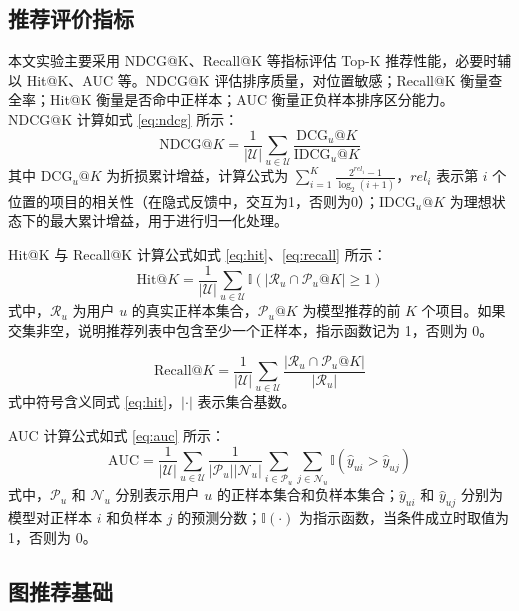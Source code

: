 \subsection{推荐评价指标}
本文实验主要采用 NDCG@K、Recall@K 等指标评估 Top-K 推荐性能，必要时辅以 Hit@K、AUC 等。NDCG@K 评估排序质量，对位置敏感；Recall@K 衡量查全率；Hit@K 衡量是否命中正样本；AUC 衡量正负样本排序区分能力。NDCG@K 计算如式 \eqref{eq:ndcg} 所示：
    \begin{equation}
        \text{NDCG}@K = \frac{1}{|\mathcal{U}|} \sum_{u \in \mathcal{U}} \frac{\text{DCG}_u@K}{\text{IDCG}_u@K}
        \label{eq:ndcg}
    \end{equation}
    其中 $\text{DCG}_u@K$ 为折损累计增益，计算公式为 $\sum_{i=1}^{K} \frac{2^{rel_i} - 1}{\log_2(i+1)}$，$rel_i$ 表示第 $i$ 个位置的项目的相关性（在隐式反馈中，交互为1，否则为0）；$\text{IDCG}_u@K$ 为理想状态下的最大累计增益，用于进行归一化处理。

Hit@K 与 Recall@K 计算公式如式 \eqref{eq:hit}、\eqref{eq:recall} 所示：
\begin{equation}
    \text{Hit}@K = \frac{1}{|\mathcal{U}|} \sum_{u \in \mathcal{U}} \mathbb{I}(|\mathcal{R}_u \cap \mathcal{P}_u@K| \geq 1)
    \label{eq:hit}
\end{equation}
式中，$\mathcal{R}_u$ 为用户 $u$ 的真实正样本集合，$\mathcal{P}_u@K$ 为模型推荐的前 $K$ 个项目。如果交集非空，说明推荐列表中包含至少一个正样本，指示函数记为 1，否则为 0。

\begin{equation}
    \text{Recall}@K = \frac{1}{|\mathcal{U}|} \sum_{u \in \mathcal{U}} \frac{|\mathcal{R}_u \cap \mathcal{P}_u@K|}{|\mathcal{R}_u|}
    \label{eq:recall}
\end{equation}
式中符号含义同式 \eqref{eq:hit}，$|\cdot|$ 表示集合基数。

AUC 计算公式如式 \eqref{eq:auc} 所示：
    \begin{equation}
        \text{AUC} = \frac{1}{|\mathcal{U}|} \sum_{u \in \mathcal{U}} \frac{1}{|\mathcal{P}_u||\mathcal{N}_u|} \sum_{i \in \mathcal{P}_u} \sum_{j \in \mathcal{N}_u} \mathbb{I}(\hat{y}_{ui} > \hat{y}_{uj})
        \label{eq:auc}
    \end{equation}
    式中，$\mathcal{P}_u$ 和 $\mathcal{N}_u$ 分别表示用户 $u$ 的正样本集合和负样本集合；$\hat{y}_{ui}$ 和 $\hat{y}_{uj}$ 分别为模型对正样本 $i$ 和负样本 $j$ 的预测分数；$\mathbb{I}(\cdot)$ 为指示函数，当条件成立时取值为 1，否则为 0。

\subsection{图推荐基础}
\label{sec:gnn_rec}


